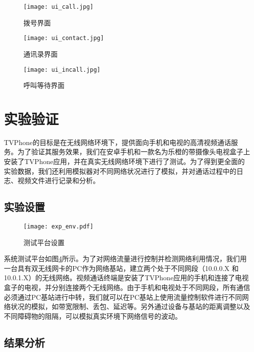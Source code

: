 \begin{figure}[htbp]
  \centering
  \texttt{[image: ui\_call.jpg]}
  \caption{拨号界面}
  \label{fig:ui_call}
\end{figure}

\begin{figure}[htbp]
  \centering
  \texttt{[image: ui\_contact.jpg]}
  \caption{通讯录界面}
  \label{fig:ui_contact}
\end{figure}

\begin{figure}[htbp]
  \centering
  \texttt{[image: ui\_incall.jpg]}
  \caption{呼叫等待界面}
  \label{fig:ui_incall}
\end{figure}

\section{实验验证}

TVPhone的目标是在无线网络环境下，提供面向手机和电视的高清视频通话服务。为了验证其服务效果，我们在安卓手机和一款名为乐橙的带摄像头电视盒子上安装了TVPhone应用，并在真实无线网络环境下进行了测试。为了得到更全面的实验数据，我们还利用模拟器对不同网络状况进行了模拟，并对通话过程中的日志、视频文件进行记录和分析。

\subsection{实验设置}
\begin{figure}[htbp]
  \centering
  \texttt{[image: exp\_env.pdf]}
  \caption{测试平台设置}
  \label{fig:exp_env}
\end{figure}

系统测试平台如图\ref{fig:exp_env}所示。为了对网络流量进行控制并检测网络利用情况，我们用一台具有双无线网卡的PC作为网络基站，建立两个处于不同网段（10.0.0.X 和10.0.1.X）的无线网络。视频通话终端是安装了TVPhone应用的手机和连接了电视盒子的电视，并分别连接两个无线网络。由于手机和电视处于不同网段，所有通信必须通过PC基站进行中转，我们就可以在PC基站上使用流量控制软件进行不同网络状况的模拟，如带宽限制、丢包、延迟等。另外通过设备与基站的距离调整以及不同障碍物的阻隔，可以模拟真实环境下网络信号的波动。


\subsection{结果分析}

